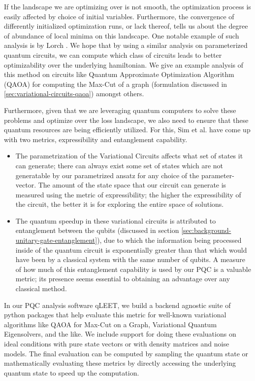 If the landscape we are optimizing over is not smooth, the optimization process is easily affected by choice of initial variables. Furthermore, the convergence of differently initialized optimization runs, or lack thereof, tells us about the degree of abundance of local minima on this landscape. One notable example of such analysis is by Lorch \cite{training-trajectories}. We hope that by using a similar analysis on parameterized quantum circuits, we can compute which class of circuits leads to better optimizability over the underlying hamiltonian. We give an example analysis of this method on circuits like Quantum Approximate Optimization Algorithm (QAOA) for computing the Max-Cut of a graph (formulation discussed in \ref{sec:variational-circuits-qaoa}) amongst others.

Furthermore, given that we are leveraging quantum computers to solve these problems and optimize over the loss landscape, we also need to ensure that these quantum resources are being efficiently utilized. For this, Sim et al. \cite{expressibility-entanglability-guzik} have come up with two metrics, expressibility and entanglement capability. 
\begin{itemize}
    \item The parametrization of the Variational Circuits affects what set of states it can generate; there can always exist some set of states which are not generatable by our parametrized ansatz for any choice of the parameter-vector. The amount of the state space that our circuit can generate is measured using the metric of expressibility; the higher the expressibility of the circuit, the better it is for exploring the entire space of solutions.  
    \item The quantum speedup in these variational circuits is attributed to entanglement between the qubits (discussed in section \ref{sec:background-unitary-gate-entanglement}), due to which the information being processed inside of the quantum circuit is exponentially greater than that which would have been by a classical system with the same number of qubits. A measure of how much of this entanglement capability is used by our PQC is a valuable metric; its presence seems essential to obtaining an advantage over any classical method.
\end{itemize}

In our PQC analysis software qLEET, we build a backend agnostic suite of python packages that help evaluate this metric for well-known variational algorithms like QAOA for Max-Cut on a Graph, Variational Quantum Eigensolvers, and the like. We include support for doing these evaluations on ideal conditions with pure state vectors or with density matrices and noise models. The final evaluation can be computed by sampling the quantum state or mathematically evaluating these metrics by directly accessing the underlying quantum state to speed up the computation.

